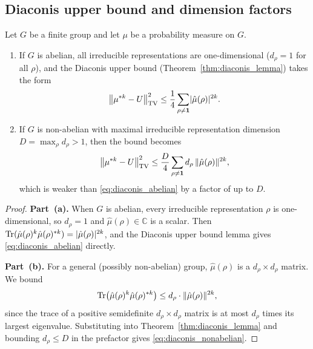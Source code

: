 \subsection{Diaconis upper bound and dimension factors}

\begin{theorem}\label{thm:diaconis}
Let $G$ be a finite group and let $\mu$ be a probability measure on $G$.
\begin{enumerate}[label=\textup{(\alph*)}]
\item If $G$ is abelian, all irreducible representations are
  one-dimensional ($d_\rho = 1$ for all $\rho$), and the Diaconis
  upper bound (Theorem~\ref{thm:diaconis_lemma}) takes the form
  \begin{equation}\label{eq:diaconis_abelian}
    \bigl\lVert \mu^{*k} - U \bigr\rVert_{\mathrm{TV}}^2
    \le \frac{1}{4} \sum_{\rho \ne \mathbf{1}}
    \lvert \hat{\mu}(\rho) \rvert^{2k}.
  \end{equation}

\item If $G$ is non-abelian with maximal irreducible representation
  dimension $D = \max_\rho d_\rho > 1$, then the bound becomes
  \begin{equation}\label{eq:diaconis_nonabelian}
    \bigl\lVert \mu^{*k} - U \bigr\rVert_{\mathrm{TV}}^2
    \le \frac{D}{4} \sum_{\rho \ne \mathbf{1}} d_\rho \,
    \lVert \hat{\mu}(\rho) \rVert^{2k},
  \end{equation}
  which is weaker than \eqref{eq:diaconis_abelian} by a factor of
  up to $D$.
\end{enumerate}
\end{theorem}

\begin{proof}
\textbf{Part~(a).}  When $G$ is abelian, every irreducible
representation $\rho$ is one-dimensional, so $d_\rho = 1$ and
$\hat{\mu}(\rho) \in \mathbb{C}$ is a scalar.  Then
$\operatorname{Tr}(\hat{\mu}(\rho)^k \hat{\mu}(\rho)^{*k}) = \lvert \hat{\mu}(\rho) \rvert^{2k}$,
and the Diaconis upper bound lemma gives \eqref{eq:diaconis_abelian}
directly.

\medskip
\noindent\textbf{Part~(b).}  For a general (possibly non-abelian)
group, $\hat{\mu}(\rho)$ is a $d_\rho \times d_\rho$ matrix.  We
bound
\[
  \operatorname{Tr}\bigl(\hat{\mu}(\rho)^k \hat{\mu}(\rho)^{*k}\bigr)
  \le d_\rho \cdot \lVert \hat{\mu}(\rho) \rVert^{2k},
\]
since the trace of a positive semidefinite $d_\rho \times d_\rho$
matrix is at most $d_\rho$ times its largest eigenvalue.  Substituting
into Theorem~\ref{thm:diaconis_lemma} and bounding $d_\rho \le D$
in the prefactor gives \eqref{eq:diaconis_nonabelian}.
\end{proof}

